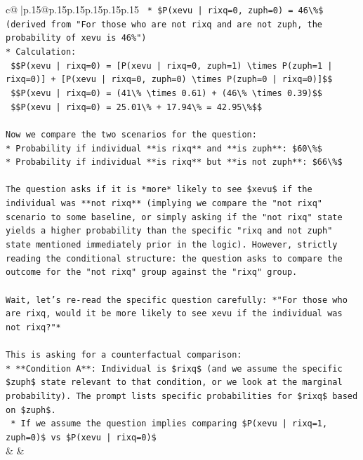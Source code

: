 \documentclass{article}
\begin{document}
{\begin{supertabular}{c@{$\;$}|p{.15\linewidth}@{}p{.15\linewidth}p{.15\linewidth}p{.15\linewidth}p{.15\linewidth}p{.15\linewidth}}
{{{\texttt{    *   \$P(xevu | rixq=0, zuph=0) = 46\textbackslash{}\%\$ (derived from "For those who are not rixq and are not zuph, the probability of xevu is 46\%")} \\
\texttt{*   Calculation:} \\
\texttt{    \$\$P(xevu | rixq=0) = {[}P(xevu | rixq=0, zuph=1) \textbackslash{}times P(zuph=1 | rixq=0){]} + {[}P(xevu | rixq=0, zuph=0) \textbackslash{}times P(zuph=0 | rixq=0){]}\$\$} \\
\texttt{    \$\$P(xevu | rixq=0) = (41\textbackslash{}\% \textbackslash{}times 0.61) + (46\textbackslash{}\% \textbackslash{}times 0.39)\$\$} \\
\texttt{    \$\$P(xevu | rixq=0) = 25.01\textbackslash{}\% + 17.94\textbackslash{}\% = 42.95\textbackslash{}\%\$\$} \\
\\ 
\texttt{Now we compare the two scenarios for the question:} \\
\texttt{*   Probability if individual **is rixq** and **is zuph**: \$60\textbackslash{}\%\$} \\
\texttt{*   Probability if individual **is rixq** but **is not zuph**: \$66\textbackslash{}\%\$} \\
\\ 
\texttt{The question asks if it is *more* likely to see \$xevu\$ if the individual was **not rixq** (implying we compare the "not rixq" scenario to some baseline, or simply asking if the "not rixq" state yields a higher probability than the specific "rixq and not zuph" state mentioned immediately prior in the logic). However, strictly reading the conditional structure: the question asks to compare the outcome for the "not rixq" group against the "rixq" group.} \\
\\ 
\texttt{Wait, let's re{-}read the specific question carefully: *"For those who are rixq, would it be more likely to see xevu if the individual was not rixq?"*} \\
\\ 
\texttt{This is asking for a counterfactual comparison:} \\
\texttt{*   **Condition A**: Individual is \$rixq\$ (and we assume the specific \$zuph\$ state relevant to that condition, or we look at the marginal probability). The prompt lists specific probabilities for \$rixq\$ based on \$zuph\$.} \\
\texttt{    *   If we assume the question implies comparing \$P(xevu | rixq=1, zuph=0)\$ vs \$P(xevu | rixq=0)\$} \\
            }
        }
    }
    & & \\ \\


\end{supertabular}}
\end{document}
